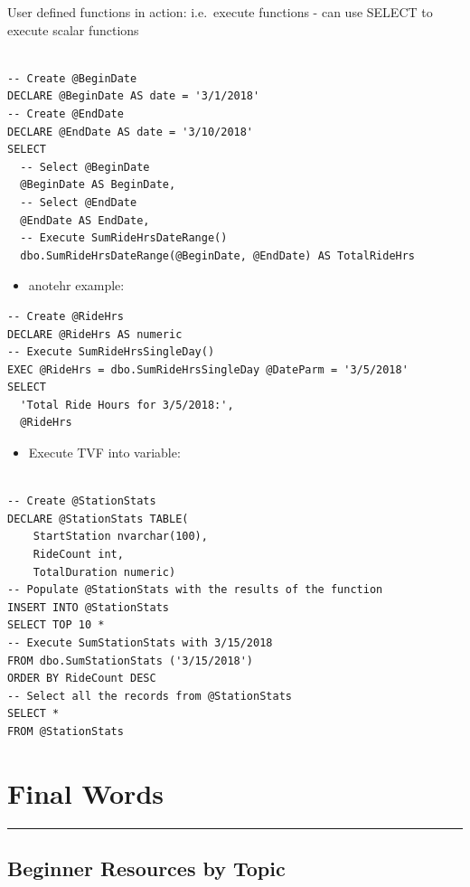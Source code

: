 \documentclass[]{book}
\providecommand{\tightlist}{%
  \setlength{\itemsep}{0pt}\setlength{\parskip}{0pt}}
\begin{document}
User defined functions in action: i.e.~execute functions
- can use SELECT to execute scalar functions

\begin{verbatim}

-- Create @BeginDate
DECLARE @BeginDate AS date = '3/1/2018'
-- Create @EndDate
DECLARE @EndDate AS date = '3/10/2018' 
SELECT
  -- Select @BeginDate
  @BeginDate AS BeginDate,
  -- Select @EndDate
  @EndDate AS EndDate,
  -- Execute SumRideHrsDateRange()
  dbo.SumRideHrsDateRange(@BeginDate, @EndDate) AS TotalRideHrs
\end{verbatim}

\begin{itemize}
\tightlist
\item
  anotehr example:
\end{itemize}

\begin{verbatim}
-- Create @RideHrs
DECLARE @RideHrs AS numeric
-- Execute SumRideHrsSingleDay()
EXEC @RideHrs = dbo.SumRideHrsSingleDay @DateParm = '3/5/2018' 
SELECT 
  'Total Ride Hours for 3/5/2018:', 
  @RideHrs
\end{verbatim}

\begin{itemize}
\tightlist
\item
  Execute TVF into variable:
\end{itemize}

\begin{verbatim}

-- Create @StationStats
DECLARE @StationStats TABLE(
	StartStation nvarchar(100), 
	RideCount int, 
	TotalDuration numeric)
-- Populate @StationStats with the results of the function
INSERT INTO @StationStats
SELECT TOP 10 *
-- Execute SumStationStats with 3/15/2018
FROM dbo.SumStationStats ('3/15/2018') 
ORDER BY RideCount DESC
-- Select all the records from @StationStats
SELECT * 
FROM @StationStats
\end{verbatim}

\hypertarget{final-words}{%
\chapter{Final Words}\label{final-words}}

\begin{center}\rule{0.5\linewidth}{0.5pt}\end{center}

\hypertarget{beginner-resources-by-topic}{%
\section{Beginner Resources by Topic}\label{beginner-resources-by-topic}}
\end{document}
